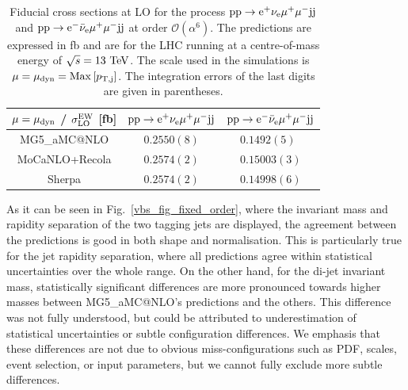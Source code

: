 \documentclass[11pt]{cernrep}
\makeatletter
\newcommand{\MGaMC}{M\protect\scalebox{0.8}{AD}G\protect\scalebox{0.8}{RAPH}5\_aMC@NLO\xspace}
\makeatother
\begin{document}
\begin{table}
\begin{center} 
\begin{tabular}{ c | c | c }
 $\mu = \mu_{\rm dyn}$ / $\sigma_{\rm LO}^{\rm EW}$ [fb] & ${\rm p} {\rm p} \to {\rm e}^+  \nu_{\rm e}  \mu^+ \mu^- {\rm j} {\rm j}$  & ${\rm p} {\rm p} \to {\rm e}^-  \bar \nu_{\rm e}  \mu^+ \mu^- {\rm j} {\rm j}$  \\
  \hline\hline
  \MGaMC                  & $0.2550(8)$  & $0.1492(5)\phantom{0}$ \\
  {\sc MoCaNLO}+{\sc Recola}      & $0.2574(2)$  & $0.15003(3)$  \\
  {\sc Sherpa}                    & $0.2574(2)$  & $0.14998(6)$   \\
  \hline
\end{tabular}
\end{center}
\caption{
Fiducial cross sections at LO for the process ${\rm p}{\rm p}\to{\rm e}^+\nu_{\rm e}\mu^+\mu^-{\rm j}{\rm j}$ and ${\rm p}{\rm p}\to{\rm e}^-\bar\nu_{\rm e}\mu^+\mu^-{\rm j}{\rm j}$ at order $\mathcal{O} (\alpha^6)$.
The predictions are expressed in fb and are for the LHC running at a centre-of-mass energy of $\sqrt{s}=13 {\rm~TeV}$.
The scale used in the simulations is $\mu = \mu_{\rm dyn} = {\rm Max}\left[p_{\rm T, j}\right]$.
The integration errors of the last digits are given in parentheses.}
\label{table:xsectLOdyn}
\end{table}

As it can be seen in Fig.~\ref{vbs_fig_fixed_order}, where the invariant mass and rapidity separation of the two tagging jets are displayed, the agreement between the predictions is good in both shape and normalisation.
This is particularly true for the jet rapidity separation, where all predictions agree within statistical uncertainties over the whole range.
On the other hand, for the di-jet invariant mass, statistically significant differences are more pronounced towards higher masses between \MGaMC's predictions and the others. 
This difference was not fully understood, but could be attributed to underestimation of statistical uncertainties or subtle configuration differences.
We emphasis that these differences are not due to obvious miss-configurations such as PDF, scales, event selection, or input parameters,
but we cannot fully exclude more subtle differences.
\end{document}
